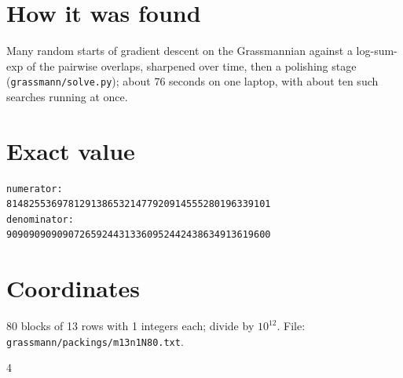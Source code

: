 \documentclass[11pt,a4paper]{article}
\begin{document}
\section{How it was found}
Many random starts of gradient descent on the Grassmannian against a log-sum-exp of the pairwise overlaps, sharpened over time, then a polishing stage (\texttt{grassmann/solve.py}); about 76 seconds on one laptop, with about ten such searches running at once.


\appendix
\section{Exact value}
{\small
\begin{verbatim}
numerator:
81482553697812913865321477920914555280196339101
denominator:
90909090909072659244313360952442438634913619600
\end{verbatim}}

\section{Coordinates}
80 blocks of 13 rows with 1 integers each; divide by $10^{12}$. File: \texttt{grassmann/packings/m13n1N80.txt}.
{\tiny
\begin{multicols}{4}
\end{multicols}}
\end{document}
